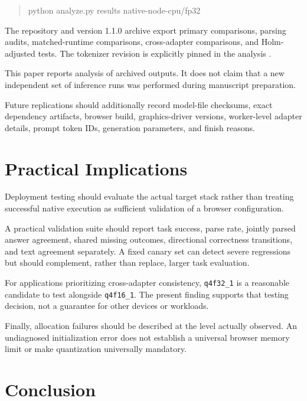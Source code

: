 \documentclass[conference]{IEEEtran}
\newcommand{\mlchalf}{\texttt{q4f16\_1}}
\newcommand{\mlcfull}{\texttt{q4f32\_1}}
\begin{document}
\begin{quote}
\small\ttfamily
python analyze.py results native-node-cpu/fp32
\end{quote}

The repository and version 1.1.0 archive export primary
comparisons, parsing audits, matched-runtime comparisons,
cross-adapter comparisons, and Holm-adjusted tests.
The tokenizer revision is explicitly pinned in the
analysis \cite{repository}.

This paper reports analysis of archived outputs.
It does not claim that a new independent set of inference
runs was performed during manuscript preparation.

Future replications should additionally record model-file
checksums, exact dependency artifacts, browser build,
graphics-driver versions, worker-level adapter details,
prompt token IDs, generation parameters, and finish reasons.

\section{Practical Implications}
\label{sec:implications}

Deployment testing should evaluate the actual target stack
rather than treating successful native execution as
sufficient validation of a browser configuration.

A practical validation suite should report task success,
parse rate, jointly parsed answer agreement, shared missing
outcomes, directional correctness transitions, and text
agreement separately.
A fixed canary set can detect severe regressions but should
complement, rather than replace, larger task evaluation.

For applications prioritizing cross-adapter consistency,
\mlcfull{} is a reasonable candidate to test alongside
\mlchalf{}.
The present finding supports that testing decision,
not a guarantee for other devices or workloads.

Finally, allocation failures should be described at the
level actually observed.
An undiagnosed initialization error does not establish a
universal browser memory limit or make quantization
universally mandatory.


\section{Conclusion}
\label{sec:conclusion}
\end{document}
